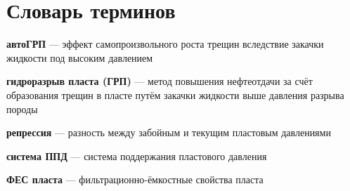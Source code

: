 \chapter*{Словарь терминов}             %

\textbf{автоГРП} --- эффект самопроизвольного роста трещин вследствие закачки жидкости под высоким давлением

\textbf{гидроразрыв пласта (ГРП)} --- метод повышения нефтеотдачи за счёт образования трещин в пласте путём закачки жидкости выше давления разрыва породы

\textbf{репрессия} --- разность между забойным и текущим пластовым давлениями

\textbf{система ППД} --- система поддержания пластового давления

\textbf{ФЕС пласта} --- фильтрационно-ёмкостные свойства пласта
